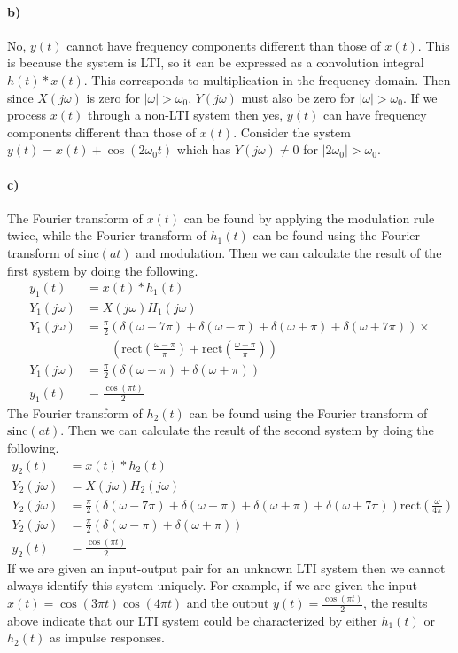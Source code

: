 \documentclass[12pt]{article}
\begin{document}
\paragraph{b)}

No, \(y(t)\) cannot have frequency components different than those of \(x(t)\). This is because the system is LTI, so it can be expressed
as a convolution integral \(h(t)*x(t)\). This corresponds to multiplication in the frequency domain. Then since \(X(j\omega)\) is zero
for \(|\omega|>\omega_0\), \(Y(j\omega)\) must also be zero for \(|\omega|>\omega_0\). If we process \(x(t)\) through a non-LTI system then
yes, \(y(t)\) can have frequency components different than those of \(x(t)\). Consider the system \(y(t)=x(t)+\cos(2\omega_0 t)\) which has
\(Y(j\omega)\neq 0\) for \(|2\omega_0|>\omega_0\).

\paragraph{c)}

The Fourier transform of \(x(t)\) can be found by applying the modulation rule twice, while the Fourier transform of \(h_1(t)\) can be found using
the Fourier transform of \(\text{sinc}(at)\) and modulation. Then we can calculate the result of the first system by doing the following.
\begin{align*}
    y_1(t)&=x(t)*h_1(t)\\
    Y_1(j\omega)&=X(j\omega)H_1(j\omega)\\
    Y_1(j\omega)&=\frac{\pi}{2}(\delta(\omega-7\pi)+\delta(\omega-\pi)+\delta(\omega+\pi)+\delta(\omega+7\pi))\times\\
    &\qquad\left(\text{rect}\left(\frac{\omega-\pi}{\pi}\right)+\text{rect}\left(\frac{\omega+\pi}{\pi}\right)\right)\\
    Y_1(j\omega)&=\frac{\pi}{2}(\delta(\omega-\pi)+\delta(\omega+\pi))\\
    y_1(t)&=\frac{\cos(\pi t)}{2}
\end{align*}
The Fourier transform of \(h_2(t)\) can be found using the Fourier transform of \(\text{sinc}(at)\). Then we can calculate the result of the second system by doing the following.
\begin{align*}
    y_2(t)&=x(t)*h_2(t)\\
    Y_2(j\omega)&=X(j\omega)H_2(j\omega)\\
    Y_2(j\omega)&=\frac{\pi}{2}(\delta(\omega-7\pi)+\delta(\omega-\pi)+\delta(\omega+\pi)+\delta(\omega+7\pi))\text{rect}\left(\frac{\omega}{4\pi}\right)\\
    Y_2(j\omega)&=\frac{\pi}{2}(\delta(\omega-\pi)+\delta(\omega+\pi))\\
    y_2(t)&=\frac{\cos(\pi t)}{2}
\end{align*}
If we are given an input-output pair for an unknown LTI system then we cannot always identify this system uniquely. For example, if we are given the input \(x(t)=\cos(3\pi t)\cos(4\pi t)\)
and the output \(y(t)=\frac{\cos(\pi t)}{2}\), the results above indicate that our LTI system could be characterized by either \(h_1(t)\) or \(h_2(t)\) as impulse responses.
\end{document}
